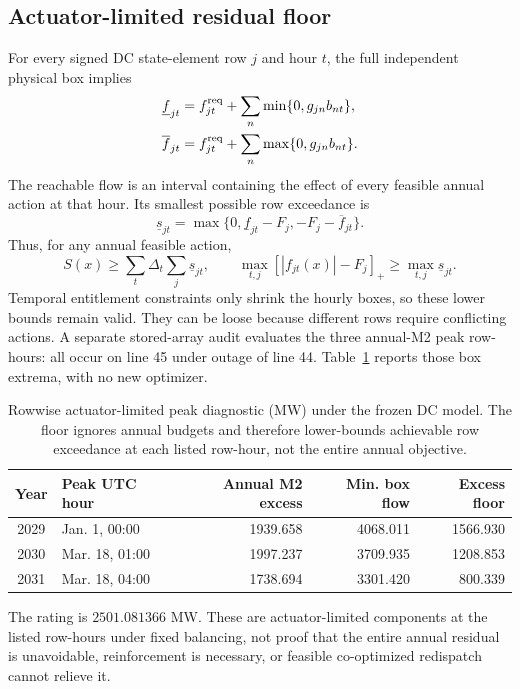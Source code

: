 \documentclass[11pt]{article}
\begin{document}
\subsection{Actuator-limited residual floor}
For every signed DC state-element row $j$ and hour $t$, the full independent physical box implies
\begin{align}
 \underline f_{jt}&=f_{jt}^{\rm req}+\sum_n\min\{0,g_{jn}b_{nt}\},\\
 \overline f_{jt}&=f_{jt}^{\rm req}+\sum_n\max\{0,g_{jn}b_{nt}\}.
\end{align}
The reachable flow is an interval containing the effect of every feasible annual action at that hour. Its smallest possible row exceedance is
\begin{equation}
 \underline s_{jt}=\max\{0,\underline f_{jt}-F_j,-F_j-\overline f_{jt}\}.
\end{equation}
Thus, for any annual feasible action,
\begin{equation}
 S(x)\geq\sum_t\Delta_t\sum_j\underline s_{jt},\qquad
 \max_{t,j}[|f_{jt}(x)|-F_j]_+\geq\max_{t,j}\underline s_{jt}.
\end{equation}
Temporal entitlement constraints only shrink the hourly boxes, so these lower bounds remain valid. They can be loose because different rows require conflicting actions. A separate stored-array audit evaluates the three annual-M2 peak row-hours: all occur on line 45 under outage of line 44. Table~\ref{tab:peakfloor} reports those box extrema, with no new optimizer.\begin{table}[ht]
\centering\small
\caption{Rowwise actuator-limited peak diagnostic (MW) under the frozen DC model. The floor ignores annual budgets and therefore lower-bounds achievable row exceedance at each listed row-hour, not the entire annual objective.}
\label{tab:peakfloor}
\begin{tabular}{@{}clrrr@{}}\toprule
Year & Peak UTC hour & Annual M2 excess & Min. box flow & Excess floor\\\midrule
2029 & Jan. 1, 00:00 & 1939.658 & 4068.011 & 1566.930\\
2030 & Mar. 18, 01:00 & 1997.237 & 3709.935 & 1208.853\\
2031 & Mar. 18, 04:00 & 1738.694 & 3301.420 & 800.339\\\bottomrule
\end{tabular}
\end{table}
The rating is $2501.081366$ MW. These are actuator-limited components at the listed row-hours under fixed balancing, not proof that the entire annual residual is unavoidable, reinforcement is necessary, or feasible co-optimized redispatch cannot relieve it.
\end{document}
